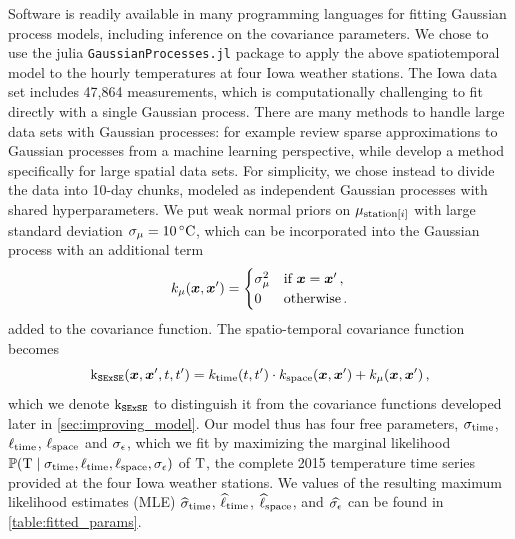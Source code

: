 \documentclass[12pt]{article}
\begin{document}
Software is readily available in many programming languages for fitting Gaussian process models, including inference on the covariance parameters. We chose to use the julia \texttt{GaussianProcesses.jl} package to apply the above spatiotemporal model to the hourly temperatures at four Iowa weather stations.
The Iowa data set includes 47,864 measurements, which is computationally challenging to fit directly with a single Gaussian process.
There are many methods to handle large data sets with Gaussian processes: for example \citet{quinonero2007approximation} review sparse approximations to Gaussian processes from a machine learning perspective, while \citet{banerjee2008gaussian} develop a method specifically for large spatial data sets.
For simplicity, we chose instead to divide the data into 10-day chunks, modeled as independent Gaussian processes with shared hyperparameters.
We put weak normal priors on \(\mu_{\mathrm{station}\left\lbrack i\right\rbrack}\) with large standard deviation \(\sigma_{\mu}=10\,{}^{\circ}\mathrm{C}\), which can be incorporated into the Gaussian process with an additional term
\begin{equation}
    k_{\mu}(\bm{x}, \bm{x}') = \begin{cases}
\sigma_\mu^2 &\text{if } \bm{x} = \bm{x}'\,, \\
0 &\text{otherwise}\,.
\end{cases}
\end{equation}
added to the covariance function.
The spatio-temporal covariance function becomes
\begin{equation}
    \operatorname{k_{\mathtt{SExSE}}}(\bm{x},\bm{x}',t,t') = k_{\mathrm{time}}(t,t') \cdot k_{\mathrm{space}}(\bm{x}, \bm{x}') + k_\mu(\bm{x}, \bm{x}') \,,
    \label{eq:ksese}
\end{equation}
which we denote \(\operatorname{k_{\mathtt{SExSE}}}\) to distinguish it from the covariance functions developed later in \autoref{sec:improving_model}.
\label{sec:hyperparameters}
Our model thus has four free parameters, \(\sigma_{\mathrm{time}}\), \(\ell_{\mathrm{time}}\), \(\ell_{\mathrm{space}}\) and \(\sigma_{\epsilon}\), which we fit by maximizing the marginal likelihood \( \Pr\del{ \T \mid {\sigma_{\subtime},\ell_{\subtime},\ell_{\subspace},\sigman} }\) of \(\mathrm{T}\), the complete 2015 temperature time series provided at the four Iowa weather stations.
We values of the resulting maximum likelihood estimates (MLE) 
\(\widehat\sigma_{\mathrm{time}}\), \(\widehat\ell_{\mathrm{time}}\), \(\widehat\ell_{\mathrm{space}}\), and \(\widehat{\sigma_{\epsilon}}\)
can be found in \autoref{table:fitted_params}.
\end{document}
